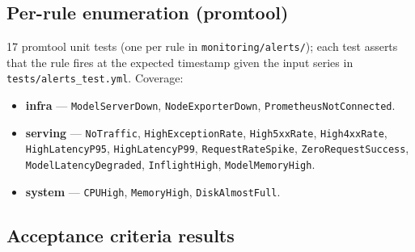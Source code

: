 \documentclass[11pt,a4paper]{article}
\begin{document}
\subsection*{Per-rule enumeration (promtool)}

17 promtool unit tests (one per rule in \texttt{monitoring/alerts/}); each test asserts that the rule fires at the expected timestamp given the input series in \texttt{tests/alerts\_test.yml}. Coverage:

\begin{itemize}[leftmargin=1.5em,itemsep=0pt]
  \item \textbf{infra} --- \texttt{ModelServerDown}, \texttt{NodeExporterDown}, \texttt{PrometheusNotConnected}.
  \item \textbf{serving} --- \texttt{NoTraffic}, \texttt{HighExceptionRate}, \texttt{High5xxRate}, \texttt{High4xxRate}, \texttt{HighLatencyP95}, \texttt{HighLatencyP99}, \texttt{RequestRateSpike}, \texttt{ZeroRequestSuccess}, \texttt{ModelLatencyDegraded}, \texttt{InflightHigh}, \texttt{ModelMemoryHigh}.
  \item \textbf{system} --- \texttt{CPUHigh}, \texttt{MemoryHigh}, \texttt{DiskAlmostFull}.
\end{itemize}

\subsection*{Acceptance criteria results}
\end{document}
